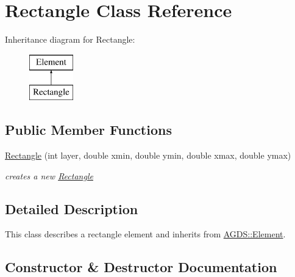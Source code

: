 \hypertarget{class_a_g_d_s_1_1_rectangle}{}\section{Rectangle Class Reference}
\label{class_a_g_d_s_1_1_rectangle}
Inheritance diagram for Rectangle\+:\begin{figure}[H]
\begin{center}
\leavevmode
\includegraphics[height=2.000000cm]{class_a_g_d_s_1_1_rectangle}
\end{center}
\end{figure}
\subsection*{Public Member Functions}
\begin{DoxyCompactItemize}
\item 
\hyperlink{class_a_g_d_s_1_1_rectangle_a84899edb51e65c78535f0b06b266f11b}{Rectangle} (int layer, double xmin, double ymin, double xmax, double ymax)
\begin{DoxyCompactList}\small\item\em creates a new \hyperlink{class_a_g_d_s_1_1_rectangle}{Rectangle} \end{DoxyCompactList}\end{DoxyCompactItemize}


\subsection{Detailed Description}
This class describes a rectangle element and inherits from \hyperlink{class_a_g_d_s_1_1_element}{A\+G\+D\+S\+::\+Element}. 

\subsection{Constructor \& Destructor Documentation}
\mbox{\label{class_a_g_d_s_1_1_rectangle_a84899edb51e65c78535f0b06b266f11b}} 
